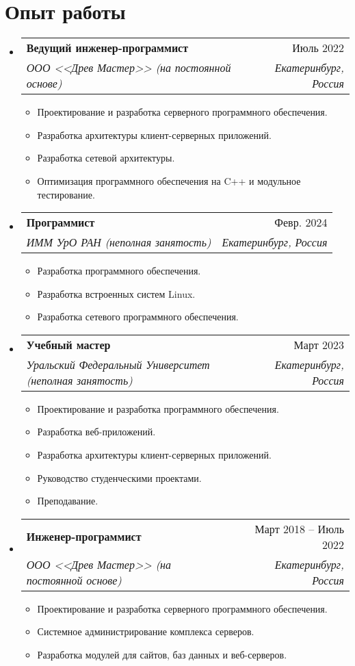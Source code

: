 \documentclass[a4paper,11pt]{article}
\makeatletter
\newcommand{\resumeItem}[1]{
    \item{
                {#1 \vspace{-4pt}}
          }
}
\newcommand{\resumeSubheading}[4]{
    \vspace{-2pt}\item
    \begin{tabular*}{0.97\textwidth}[t]{l@{\extracolsep{\fill}}r}
        \textbf{#1} & #2 \\
        \textit{\small #3} & \textit{\small #4} \\
    \end{tabular*}\vspace{-10pt}
}
\newcommand{\resumeSubHeadingListStart}{\begin{itemize}[leftmargin=0.15in, label={}]}
\newcommand{\resumeSubHeadingListEnd}{\end{itemize}}
\newcommand{\resumeItemListStart}{\begin{itemize}}
\newcommand{\resumeItemListEnd}{\end{itemize}\vspace{-2pt}}
\makeatother
\begin{document}

\section{Опыт работы}
\resumeSubHeadingListStart

\resumeSubheading
    {Ведущий инженер-программист}{Июль 2022}
    {ООО <<Древ Мастер>> (на постоянной основе)}{Екатеринбург, Россия}
    \resumeItemListStart
        \small\resumeItem{Проектирование и разработка серверного программного обеспечения.}
        \resumeItem{Разработка архитектуры клиент-серверных приложений.}
        \resumeItem{Разработка сетевой архитектуры.}
        \resumeItem{Оптимизация программного обеспечения на C++ и модульное тестирование.}
    \resumeItemListEnd

\resumeSubheading
    {Программист}{Февр. 2024}
    {ИММ УрО РАН (неполная занятость)}{Екатеринбург, Россия}
    \resumeItemListStart
        \small\resumeItem{Разработка программного обеспечения.}
        \resumeItem{Разработка встроенных систем Linux.}
        \resumeItem{Разработка сетевого программного обеспечения.}
    \resumeItemListEnd

\resumeSubheading
    {Учебный мастер}{Март 2023}
    {Уральский Федеральный Университет (неполная занятость)}{Екатеринбург, Россия}
    \resumeItemListStart
        \small\resumeItem{Проектирование и разработка программного обеспечения.}
        \resumeItem{Разработка веб-приложений.}
        \resumeItem{Разработка архитектуры клиент-серверных приложений.}
        \resumeItem{Руководство студенческими проектами.}
        \resumeItem{Преподавание.}
    \resumeItemListEnd

\resumeSubheading
    {Инженер-программист}{Март 2018 -- Июль 2022}
    {ООО <<Древ Мастер>> (на постоянной основе)}{Екатеринбург, Россия}
    \resumeItemListStart
        \small\resumeItem{Проектирование и разработка серверного программного обеспечения.}
        \resumeItem{Системное администрирование комплекса серверов.}
        \resumeItem{Разработка модулей для сайтов, баз данных и веб-серверов.}
    \resumeItemListEnd


\resumeSubHeadingListEnd
\end{document}
